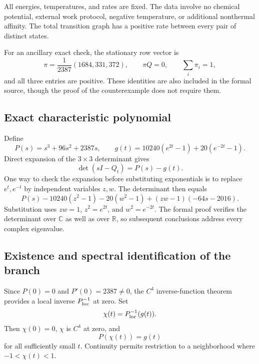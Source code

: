 \documentclass[11pt,a4paper]{article}
\newcommand{\R}{\mathbb R}\newcommand{\C}{\mathbb C}
\begin{document}
All energies, temperatures, and rates are fixed. The data involve no chemical potential, external work protocol, negative temperature, or additional nonthermal affinity. The total transition graph has a positive rate between every pair of distinct states.

For an ancillary exact check, the stationary row vector is
\begin{equation}
\pi=\frac{1}{2387}(1684,331,372),\qquad \pi Q=0,\qquad \sum_i\pi_i=1,
\label{eq:stationary}
\end{equation}
and all three entries are positive. These identities are also included in the formal source, though the proof of the counterexample does not require them.

\subsection{Exact characteristic polynomial}
Define
\begin{equation}
P(s)=s^3+96s^2+2387s,\qquad
g(t)=10240(e^{2t}-1)+20(e^{-2t}-1).
\label{eq:pg}
\end{equation}
Direct expansion of the $3\times3$ determinant gives
\begin{equation}
\det(sI-Q_t)=P(s)-g(t).
\label{eq:characteristic}
\end{equation}
One way to check the expansion before substituting exponentials is to replace $e^t,e^{-t}$ by independent variables $z,w$. The determinant then equals
\[
P(s)-10240(z^2-1)-20(w^2-1)+(zw-1)(-64s-2016).
\]
Substitution uses $zw=1$, $z^2=e^{2t}$, and $w^2=e^{-2t}$. The formal proof verifies the determinant over $\C$ as well as over $\R$, so subsequent conclusions address every complex eigenvalue.

\subsection{Existence and spectral identification of the branch}
Since $P(0)=0$ and $P'(0)=2387\ne0$, the $C^4$ inverse-function theorem provides a local inverse $P^{-1}_{\rm loc}$ at zero. Set
\[
\chi(t)=P^{-1}_{\rm loc}(g(t)).
\]
Then $\chi(0)=0$, $\chi$ is $C^4$ at zero, and
\begin{equation}
P(\chi(t))=g(t)
\label{eq:implicit}
\end{equation}
for all sufficiently small $t$. Continuity permits restriction to a neighborhood where $-1<\chi(t)<1$.
\end{document}
